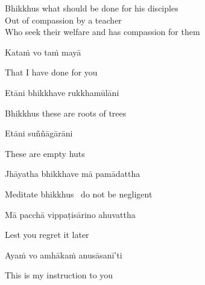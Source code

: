 \begin{english}
  Bhikkhus what should be done for his disciples\\
  Out of compassion by a teacher\\
  Who seek their welfare and has compassion for them
\end{english}

\begin{twochants}
  Kataṁ vo taṁ mayā
\end{twochants}

\begin{english}
  That I have done for you
\end{english}

\begin{twochants}
  Etāni bhikkhave rukkhamūlāni
\end{twochants}

\begin{english}
  Bhikkhus these are roots of trees
\end{english}

\begin{twochants}
  Etāni suññāgārāni
\end{twochants}

\begin{english}
  These are empty huts
\end{english}

\begin{twochants}
  Jhāyatha bhikkhave mā pamādattha
\end{twochants}

\begin{english}
  Meditate bhikkhus \breathmark\ do not be negligent
\end{english}

\begin{twochants}
  Mā pacchā vippaṭisārino ahuvattha
\end{twochants}

\begin{english}
  Lest you regret it later
\end{english}

\begin{twochants}
  Ayaṁ vo amhākaṁ anusāsanī’ti
\end{twochants}

\begin{english}
  This is my instruction to you
\end{english}

\suttaRef{[MN 19]}


